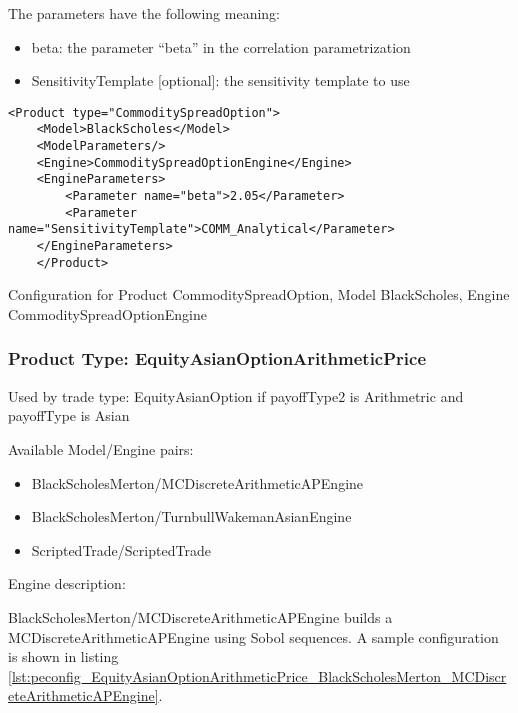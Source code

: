 The parameters have the following meaning:

\begin{itemize}
\item beta: the parameter ``beta'' in the correlation parametrization
\item SensitivityTemplate [optional]: the sensitivity template to use 
\end{itemize}

\begin{longlisting}
\begin{verbatim}
<Product type="CommoditySpreadOption">
    <Model>BlackScholes</Model>
    <ModelParameters/>
    <Engine>CommoditySpreadOptionEngine</Engine>
    <EngineParameters>
        <Parameter name="beta">2.05</Parameter>
        <Parameter name="SensitivityTemplate">COMM_Analytical</Parameter>
    </EngineParameters>
    </Product>
\end{verbatim}
\caption{Configuration for Product CommoditySpreadOption, Model BlackScholes, Engine CommoditySpreadOptionEngine}
\label{lst:peconfig_CommoditySpreadOption_BlackScholes_CommoditySpreadOptionEngine}
\end{longlisting}
    
\subsubsection{Product Type: EquityAsianOptionArithmeticPrice}

Used by trade type: EquityAsianOption if payoffType2 is Arithmetric and payoffType is Asian

Available Model/Engine pairs:

\begin{itemize}
  \item BlackScholesMerton/MCDiscreteArithmeticAPEngine
  \item BlackScholesMerton/TurnbullWakemanAsianEngine
  \item ScriptedTrade/ScriptedTrade
\end{itemize}

Engine description:

BlackScholesMerton/MCDiscreteArithmeticAPEngine builds a MCDiscreteArithmeticAPEngine using Sobol sequences. A sample
configuration is shown in listing
\ref{lst:peconfig_EquityAsianOptionArithmeticPrice_BlackScholesMerton_MCDiscreteArithmeticAPEngine}.

